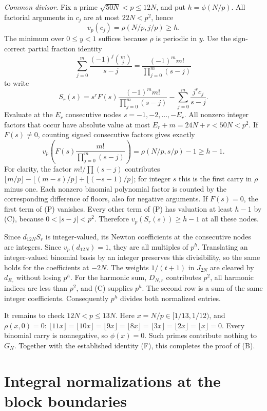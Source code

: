 \documentclass[11pt]{article}
\begin{document}
\emph{Common divisor.}
Fix a prime $\sqrt{50N}<p\le12N$, and put $h=\phi(N/p)$.
All factorial arguments in $c_j$ are at most $22N<p^2$, hence
\[
 v_p(c_j)=\rho(N/p,j/p)\ge h.
 \tag{C}
\]
The minimum over $0\le y<1$ suffices because $\rho$ is periodic in $y$.
Use the sign-correct partial fraction identity
\[
 \sum_{j=0}^m\frac{(-1)^j\binom mj}{s-j}
   =\frac{(-1)^m m!}{\prod_{j=0}^m(s-j)}
\]
to write
\[
 S_r(s)=s^rF(s)\frac{(-1)^m m!}{\prod_{j=0}^m(s-j)}
                -\sum_{j=0}^m\frac{j^rc_j}{s-j}.
 \tag{P}
\]
Evaluate at the $E_r$ consecutive nodes $s=-1,-2,\ldots,-E_r$.
All nonzero integer factors that occur have absolute value at most
$E_r+m=24N+r<50N<p^2$.
If $F(s)\ne0$, counting signed consecutive factors gives exactly
\[
 v_p\!\left(F(s)\frac{m!}{\prod_{j=0}^m(s-j)}\right)
       =\rho(N/p,s/p)-1\ge h-1.
\]
For clarity, the factor $m!/\prod(s-j)$ contributes
$\lfloor m/p\rfloor-\lfloor(m-s)/p\rfloor+
\lfloor(-s-1)/p\rfloor$; for integer $s$ this is the first carry in
$\rho$ minus one. Each nonzero binomial polynomial factor is counted
by the corresponding difference of floors, also for negative arguments.
If $F(s)=0$, the first term of (P) vanishes.
Every other term of (P) has valuation at least $h-1$ by (C), because
$0<|s-j|<p^2$. Therefore $v_p(S_r(s))\ge h-1$ at all these nodes.

Since $d_{12N}S_r$ is integer-valued, its Newton coefficients at the
consecutive nodes are integers. Since $v_p(d_{12N})=1$, they are all
multiples of $p^h$. Translating an integer-valued binomial basis by an
integer preserves this divisibility, so the same holds for the
coefficients at $-2N$. The weights $1/(t+1)$ in $J_{2N}$ are cleared
by $d_{E_r}$ without losing $p^h$.
For the harmonic sum, $D_{N,r}$ contributes $p^2$,
all harmonic indices are less than $p^2$, and (C) supplies $p^h$.
The second row is a sum of the same integer coefficients.
Consequently $p^h$ divides both normalized entries.

It remains to check $12N<p\le13N$. Here
$x=N/p\in[1/13,1/12)$, and $\rho(x,0)=0$:
$\lfloor11x\rfloor=\lfloor10x\rfloor=\lfloor9x\rfloor=
\lfloor8x\rfloor=\lfloor3x\rfloor=\lfloor2x\rfloor=
\lfloor x\rfloor=0$. Every binomial carry is nonnegative, so
$\phi(x)=0$. Such primes contribute nothing to $G_N$.
Together with the established identity (F), this completes the proof of (B).



\section{Integral normalizations at the block boundaries}\label{app:blocks}
\end{document}
